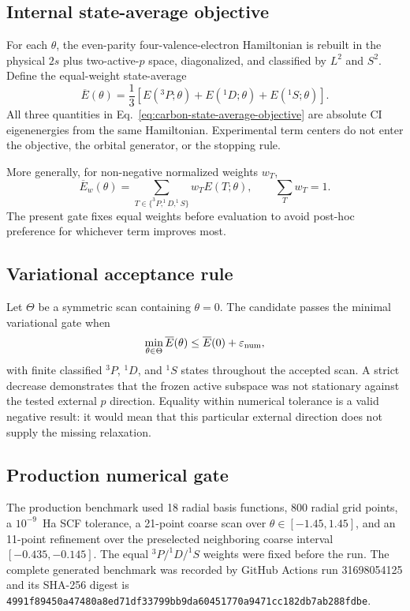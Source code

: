 \subsection{Internal state-average objective}
For each $\theta$, the even-parity four-valence-electron Hamiltonian is rebuilt in the physical $2s$ plus two-active-$p$ space, diagonalized, and classified by $L^2$ and $S^2$.  Define the equal-weight state-average
\begin{equation}
\overline E(\theta)
=\frac{1}{3}\left[E(^3P;\theta)+E(^1D;\theta)+E(^1S;\theta)\right].
\label{eq:carbon-state-average-objective}
\end{equation}
All three quantities in Eq.~\eqref{eq:carbon-state-average-objective} are absolute CI eigenenergies from the same Hamiltonian.  Experimental term centers do not enter the objective, the orbital generator, or the stopping rule.

More generally, for non-negative normalized weights $w_T$,
\begin{equation}
\overline E_w(\theta)=\sum_{T\in\{^3P,^1D,^1S\}}w_T E(T;\theta),
\qquad \sum_T w_T=1.
\end{equation}
The present gate fixes equal weights before evaluation to avoid post-hoc preference for whichever term improves most.

\subsection{Variational acceptance rule}
Let $\Theta$ be a symmetric scan containing $\theta=0$.  The candidate passes the minimal variational gate when
\begin{equation}
\min_{\theta\in\Theta}\overline E(\theta)
\leq \overline E(0)+\varepsilon_{\rm num},
\end{equation}
with finite classified $^3P$, $^1D$, and $^1S$ states throughout the accepted scan.  A strict decrease demonstrates that the frozen active subspace was not stationary against the tested external $p$ direction.  Equality within numerical tolerance is a valid negative result: it would mean that this particular external direction does not supply the missing relaxation.

\subsection{Production numerical gate}
The production benchmark used 18 radial basis functions, 800 radial grid points, a $10^{-9}$~Ha SCF tolerance, a 21-point coarse scan over $\theta\in[-1.45,1.45]$, and an 11-point refinement over the preselected neighboring coarse interval $[-0.435,-0.145]$.  The equal $^3P/^1D/^1S$ weights were fixed before the run.  The complete generated benchmark was recorded by GitHub Actions run 31698054125 and its SHA-256 digest is \texttt{4991f89450a47480a8ed71df33799bb9da60451770a9471cc182db7ab288fdbe}.

